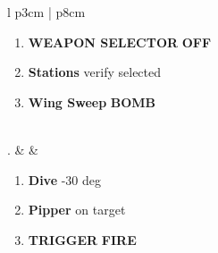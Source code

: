 \documentclass[8pt,usenames,dvipsnames,twoside]{article}
\begin{document}
\begin{center}
\begin{tabular}{l p{3cm} | p{8cm}}
\begin{minipage}[t]{\linewidth}
\begin{enumerate}[label=(\alph*)]
						\item \textbf{WEAPON SELECTOR} \dotfill \textbf{OFF}
						\item \textbf{Stations} \dotfill verify selected
						\item \textbf{Wing Sweep} \dotfill \textbf{BOMB}
					\end{enumerate} 
				\end{minipage} \\
				. &  &
				\begin{minipage}[t]{\linewidth}
					\vspace{-7pt}
					\begin{enumerate}[label=(\alph*)]
						\item \textbf{Dive} -30 deg
						\item \textbf{Pipper} \dotfill on target
						\item \textbf{TRIGGER} \dotfill \textbf{FIRE}
					\end{enumerate}
				\end{minipage} \\
				\bottomrule
			\end{tabular}
		\end{center}
		
\end{document}
